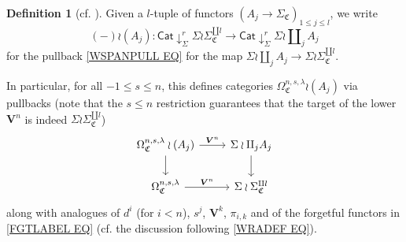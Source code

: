\documentclass[a4paper,10pt
,draft
]{article}%
\numberwithin{equation}{section}
\numberwithin{figure}{section}
\theoremstyle{definition} %
\newtheorem{definition}[equation]{Definition}%
\newcommand{\1}{\ensuremath{\mathbbm 1}}%
\begin{document}
\begin{definition}[{cf. \cite[Notation 5.24]{BP_geo}}]\label{NA_DEF}
      Given a $l$-tuple of functors
      $\left(A_j \to \Sigma_{\mathfrak C} \right)_{1\leq j \leq l}$,
we write
\begin{equation}\label{WRAJDEF EQ}
(-) \wr (A_j) \colon 
\mathsf{Cat} \downarrow^r_{\Sigma} \Sigma \wr \Sigma_{\mathfrak{C}}^{\amalg l}
\to
\mathsf{Cat} \downarrow^r_{\Sigma} \Sigma \wr \amalg_j A_j
\end{equation}
for the pullback \eqref{WSPANPULL EQ} for the map
$\Sigma \wr \amalg_j A_j \to \Sigma \wr \Sigma_{\mathfrak{C}}^{\amalg l}$.
 
In particular, for all $-1\leq s \leq n$, this defines categories
$\Omega^{n,s,\lambda}_{\mathfrak{C}} \wr (A_j)$ via pullbacks
(note that the $s \leq n$ restriction guarantees that the target of the lower $\boldsymbol{V}^n$ is indeed $\Sigma \wr \Sigma_{\mathfrak{C}}^{\amalg l}$)
\begin{equation}\label{WRAJSAMPLE EQ}
\begin{tikzcd}
	\Omega^{n,s,\lambda}_{\mathfrak{C}} \wr (A_j) \ar{r}{\boldsymbol{V}^n} \ar{d} &
	\Sigma \wr \amalg_j A_j  \ar{d}
\\
	\Omega^{n,s,\lambda}_{\mathfrak{C}} \ar{r}{\boldsymbol{V}^n} &
	\Sigma \wr \Sigma_{\mathfrak{C}}^{\amalg l}
\end{tikzcd}
\end{equation}
along with analogues of $d^i$ (for $i<n$), $s^j$, $\boldsymbol{V}^k$, $\pi_{i,k}$
and of the forgetful functors in \eqref{FGTLABEL EQ}
(cf. the discussion following \eqref{WRADEF EQ}).
\end{definition}

 
\end{document}
